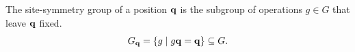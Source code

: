 \documentclass[12pt]{report}
\begin{document}
\begin{definition} \label{def:sitesym}
The site-symmetry group of a position ${\vb{q}}$ is the subgroup of operations $g \in G$ that leave ${\vb{q}}$ fixed.
\begin{equation} \label{eq:site-symmetry_def}
G_{\vb{q}} = \{g \mid g {\vb{q}} = {\vb{q}}\} \subseteq G.
\end{equation}
\end{definition}

\end{document}
